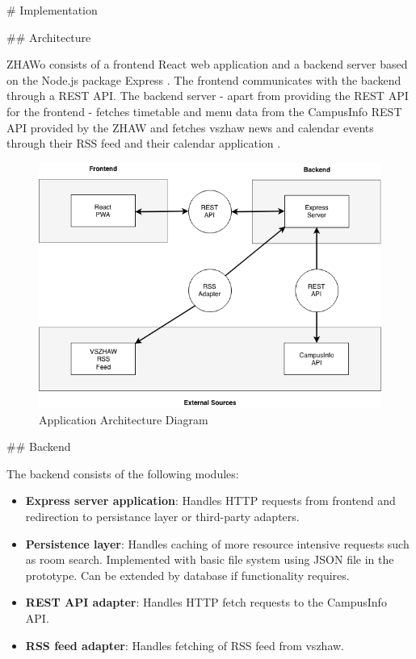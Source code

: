 \begin{markdown}

# Implementation

## Architecture

ZHAWo consists of a frontend React \cite{React} web application and a backend server based on the Node.js \cite{Node} package Express \cite{Express}. The frontend communicates with the backend through a REST API. The backend server - apart from providing the REST API for the frontend - fetches timetable and menu data from the CampusInfo REST API provided by the ZHAW \cite{WikiCampusInfo} and fetches vszhaw news and calendar events through their RSS feed \cite{vszhawRSS} and their calendar application \cite{vszhawCalendar}.

\bigskip

\begin{figure}[H]
  \includegraphics[width=14cm, center]{../../diagrams/applicationArchitecture.png}
  \caption{\textsf{Application Architecture Diagram}}
\end{figure}

\bigskip

## Backend

The backend consists of the following modules:

\begin{itemize}
  \item \textbf{Express server application}: Handles HTTP requests from frontend and redirection to persistance layer or third-party adapters.
  \item \textbf{Persistence layer}: Handles caching of more resource intensive requests such as room search. Implemented with basic file system using JSON file in the prototype. Can be extended by database if functionality requires.
  \item \textbf{REST API adapter}: Handles HTTP fetch requests to the CampusInfo API.
  \item \textbf{RSS feed adapter}: Handles fetching of RSS feed from vszhaw.
\end{itemize}


\end{markdown}
